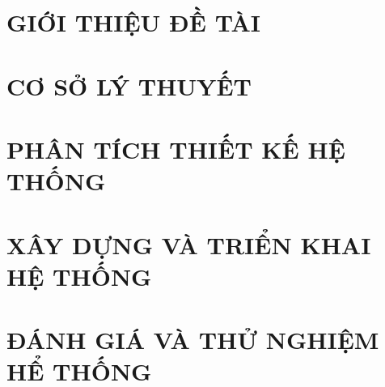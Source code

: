 \documentclass[a4paper,13pt,3p,twoside]{report}
\theoremstyle{definition}
\begin{document}
\glsaddall 
 \renewcommand*{\glossaryname}{Danh sách thuật ngữ}
\renewcommand*{\acronymname}{DANH MỤC THUẬT NGỮ VÀ TỪ VIẾT TẮT}
\renewcommand*{\entryname}{Thuật ngữ}
\renewcommand*{\descriptionname}{Ý nghĩa}
\printnoidxglossaries


% 


\newpage
{}

\pagestyle{fancy}
\fancyhf{}
\fancyhead[RE, LO]{\leftmark}
\fancyfoot[RE, LO]{\thepage}

\chapter{GIỚI THIỆU ĐỀ TÀI}
\label{chapter:Introduction}

\newpage
\pagestyle{fancy} %
\chapter{CƠ SỞ LÝ THUYẾT}
\label{chapter:Related_works}



\newpage
\chapter{PHÂN TÍCH THIẾT KẾ HỆ THỐNG}
\label{chapter:Methodology}



\newpage
\chapter{XÂY DỰNG VÀ TRIỂN KHAI HỆ THỐNG}
\label{chapter:hihi}






\newpage
\chapter{ĐÁNH GIÁ VÀ THỬ NGHIỆM HỂ THỐNG}
\label{chapter:thu-nghiem}

\end{document}
